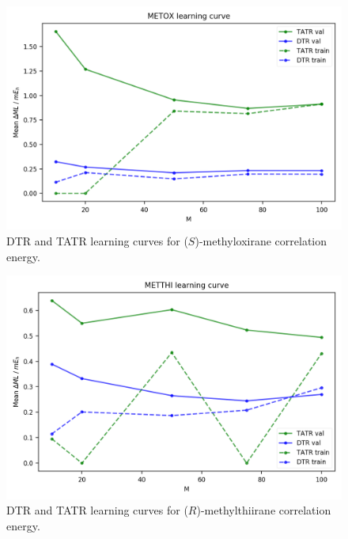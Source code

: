 \begin{figure}
    \centering
    \includegraphics[scale=1.0]{p2/figures/si/METOX_learn_e.png}
    \caption{DTR and TATR learning curves for ($\textit{S}$)-methyloxirane correlation energy.}
\end{figure}

\begin{figure}
    \centering
    \includegraphics[scale=1.0]{p2/figures/si/METTHI_learn_e.png}
    \caption{DTR and TATR learning curves for ($\textit{R}$)-methylthiirane correlation energy.}
\end{figure}

